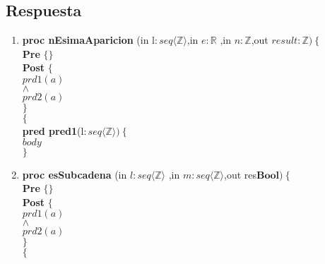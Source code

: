 \documentclass[a4paper]{article}
\begin{document}
\subsection*{Respuesta}
	\begin{enumerate}[label=\alph*)]
		\item
			
			\textbf{proc nEsimaAparicion }(in l$:seq\langle \mathbb{Z}\rangle$,in $e:\mathbb{R}$
			,in $n:\mathbb{Z}$,out $result:\mathbb{Z})\ \{$\smallskip \\
			\hspace*{6mm} \textbf{Pre }$\{ \}$\smallskip \\
			\hspace*{6mm} \textbf{Post }$\{$\\
			\hspace*{6mm} $prd1(a)$\\
			\hspace*{6mm} $\wedge$\\
			\hspace*{6mm} $prd2(a)$\\
			\hspace*{6mm} $\}$\\
			$\{$\smallskip \\
			
			\textbf{pred pred1}(l$: seq\langle \mathbb{Z}\rangle)\ \{$\smallskip \\
			\hspace*{6mm}$body$\\
			$\}$			
			
		\item
			
			\textbf{proc esSubcadena }(in $l:seq\langle \mathbb{Z}\rangle$
				,in $m:seq\langle \mathbb{Z}\rangle$,out res$\textbf{Bool} )\ \{$\smallskip \\
			\hspace*{6mm} \textbf{Pre }$\{ \}$\smallskip \\
			\hspace*{6mm} \textbf{Post }$\{$\\
			\hspace*{6mm} $prd1(a)$\\
			\hspace*{6mm} $\wedge$\\
			\hspace*{6mm} $prd2(a)$\\
			\hspace*{6mm} $\}$\\
			$\{$\smallskip \\
			

\end{enumerate}
\end{document}
